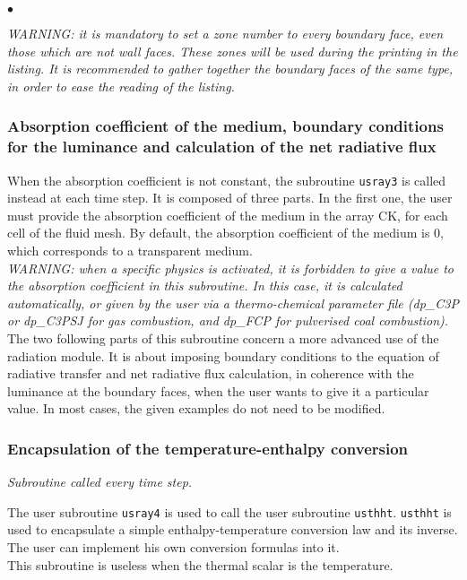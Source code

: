 {{{\begin{list}{$\bullet$}{}
\end{list}

\noindent
{\em WARNING: it is mandatory to set a zone number to every boundary
face, even those which are not wall faces. These zones will be used during the
printing in the listing. It is recommended to gather together the
boundary faces of the same type, in order to ease the reading of the
listing.}\\

\subsubsection{Absorption coefficient of the medium, boundary conditions
   for the luminance and calculation of the net radiative flux}
When the absorption coefficient is not constant, the subroutine \texttt{usray3} is called instead at each time step. It is composed of three parts. In the first one, the user
must provide the absorption coefficient of the medium in the array CK,
for each cell of the fluid mesh. By default, the absorption coefficient
of the medium is 0, which corresponds to a transparent medium.\\

{\em WARNING: when a specific physics is activated, it is forbidden to
give a value to the absorption coefficient in this subroutine. In this
case, it is calculated automatically, or given by the user {\em via} a
thermo-chemical parameter file (dp\_C3P or dp\_C3PSJ for gas combustion,
and dp\_FCP for pulverised coal combustion).}\\

\noindent
The two following parts of this subroutine concern a more advanced use
of the radiation module. It is about imposing boundary conditions to the
equation of radiative transfer and net radiative flux calculation, in
coherence with the luminance at the boundary faces, when the user wants
to give it a particular value. In most cases, the given examples do not
need to be modified.

\subsubsection{Encapsulation of the temperature-enthalpy conversion}

\noindent
\textit{Subroutine called every time step.}

The user subroutine \texttt{usray4} is used to call the user subroutine \texttt{usthht}. \texttt{usthht} is used to encapsulate a simple enthalpy-temperature
conversion law and its inverse. The user
can implement his own conversion formulas into it. \\
This subroutine is useless when the thermal scalar is the temperature.\\
\noindent

}}}
